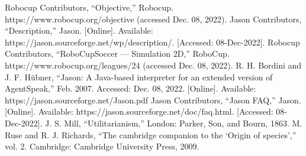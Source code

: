 \documentclass[conference]{IEEEtran}
\begin{document}
\begin{thebibliography}{00}
 Robocup Contributors, ``Objective,''
Robocup. https://www.robocup.org/objective (accessed Dec. 08, 2022).
 Jason Contributors, ``Description,''
Jason. [Online]. Available:
https://jason.sourceforge.net/wp/description/. [Accessed: 08-Dec-2022].
 Robocup Contributors, ``RoboCupSoccer ---
Simulation 2D,'' RoboCup. https://www.robocup.org/leagues/24 (accessed Dec. 08,
2022).
 R. H. Bordini and J. F. Hübner, ``Jason: A Java-based
interpreter for an extended version of AgentSpeak,'' Feb. 2007. Accessed:
Dec. 08, 2022. [Online]. Available: https://jason.sourceforge.net/Jason.pdf
 Jason Contributors, ``Jason FAQ,''
Jason. [Online]. Available:
https://jason.sourceforge.net/doc/faq.html. [Accessed: 08-Dec-2022].
 J. S. Mill, ``Utilitarianism,'' London: Parker, Son, and Bourn, 1863.
 M. Ruse and R. J. Richards, ``The cambridge companion to the `Origin of species','' vol. 2. Cambridge: Cambridge University Press, 2009.
\end{thebibliography}
\end{document}
